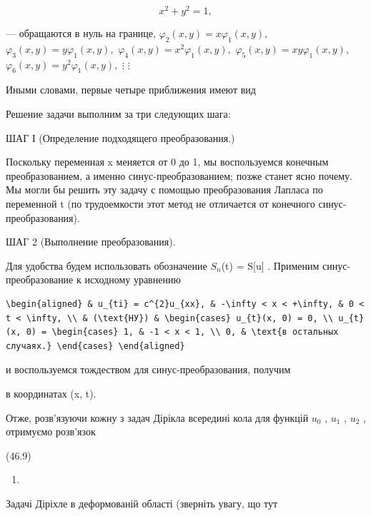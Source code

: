 \documentclass[
  ukrainian,
]{article}
\providecommand{\tightlist}{%
  \setlength{\itemsep}{0pt}\setlength{\parskip}{0pt}}
\begin{document}
\[
x^{2} + y^{2} = 1,
\]

--- обращаются в нуль на границе,
\(\varphi_2(x, y) = x\varphi_1(x, y),\)
\(\varphi_3(x, y) = y\varphi_1(x, y),\)
\(\varphi_4(x, y) = x^2\varphi_1(x, y),\)
\(\varphi_5(x, y) = xy\varphi_1(x, y),\)
\(\varphi_6(x, y) = y^2\varphi_1(x, y),\) \(\vdots\) \(\vdots\)

Иными словами, первые четыре приближения имеют вид

Решение задачи выполним за три следующих шага:

ШАГ І (Определение подходящего преобразования.)

Поскольку переменная x меняется от 0 до 1, мы воспользуемся конечным
преобразованием, а именно синус-преобразованием; позже станет ясно
почему. Мы могли бы решить эту задачу с помощью преобразования Лапласа
по переменной t (по трудоемкости этот метод не отличается от конечного
синус-преобразования).

ШАГ 2 (Выполнение преобразования).

Для удобства будем использовать обозначение \(S_n\)(t) = S{[}u{]} .
Применим синус-преобразование к исходному уравнению

\begin{verbatim}
\begin{aligned} & u_{ti} = c^{2}u_{xx}, & -\infty < x < +\infty, & 0 < t < \infty, \\ & (\text{НУ}) & \begin{cases} u_{t}(x, 0) = 0, \\ u_{t}(x, 0) = \begin{cases} 1, & -1 < x < 1, \\ 0, & \text{в остальных случаях.} \end{cases} \end{aligned}
\end{verbatim}

и воспользуемся тождеством для синус-преобразования, получим

в координатах (x, t).

Отже, розв'язуючи кожну з задач Дірікла всередині кола для функцій
\(u_0\) , \(u_1\) , \(u_2\) , отримуємо розв'язок

(46.9)

\begin{enumerate}
\def\labelenumi{\arabic{enumi}.}
\setcounter{enumi}{17}
\tightlist
\item
\end{enumerate}

Задачі Діріхле в деформованій області (зверніть увагу, що тут
\end{document}
